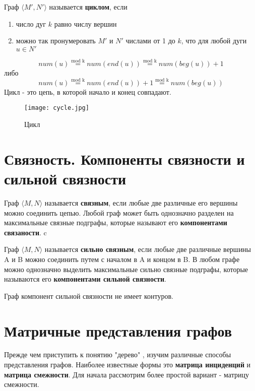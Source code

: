 \vspace{3mm}

Граф $\langle M', N'\rangle$ называется \textbf{циклом}, если
\begin{enumerate}
    \item число дуг $k$ равно числу вершин
    \item можно так пронумеровать $M'$ и $N'$ числами от 1 до $k$, что для любой дуги $u \in N'$
\end{enumerate}
\begin{equation}
    num(u) \stackrel{\text{mod k}}{=} num(end(u)) \stackrel{\text{mod k}}{=} num(beg(u)) + 1
\end{equation}
либо
\begin{equation}
    num(u) \stackrel{\text{mod k}}{=} num(end(u)) + 1 \stackrel{\text{mod k}}{=} num(beg(u))
\end{equation}
Цикл - это цепь, в которой начало и конец совпадают.
\begin{figure}[h]
    \centering 
    \texttt{[image: cycle.jpg]}
    \caption{Цикл}
\end{figure}

\section{Связность. Компоненты связности и сильной связности}
Граф $\langle M, N\rangle$ называется \textbf{связным}, если любые две различные его
вершины можно соединить цепью. Любой граф может быть однозначно разделен на максимальные
связные подграфы, которые называют его \textbf{компонентами связаности}.
c

Граф $\langle M, N\rangle$ называется \textbf{сильно связным}, если любые две различные
вершины A и B можно соединить путем с началом в A и концом в B. В любом графе можно однозначно
выделить максимальные сильно связные подграфы, которые называются его \textbf{компонентами сильной связности}.
\begin{thm}
    Граф компонент сильной связности не имеет контуров.
\end{thm}

\section{Матричные представления графов}
Прежде чем приступить к понятию "дерево" , изучим различные способы представления графов.
Наиболее известные формы это \textbf{матрица инциденций} и \textbf{матрица смежности}.
Для начала рассмотрим более простой вариант - матрицу смежности.

